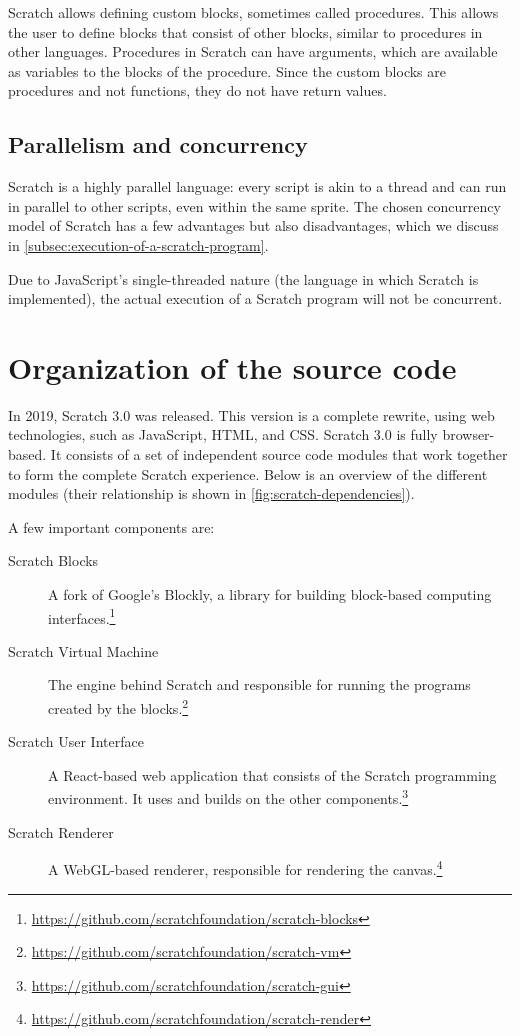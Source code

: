 \documentclass[../main]{subfiles}
\begin{document}
Scratch allows defining custom blocks, sometimes called procedures.
This allows the user to define blocks that consist of other blocks, similar to procedures in other languages.
Procedures in Scratch can have arguments, which are available as variables to the blocks of the procedure.
Since the custom blocks are procedures and not functions, they do not have return values.

\subsection{Parallelism and concurrency}\label{subsec:parallelism}

Scratch is a highly parallel language: every script is akin to a thread and can run in parallel to other scripts, even within the same sprite.
The chosen concurrency model of Scratch has a few advantages but also disadvantages, which we discuss in \cref{subsec:execution-of-a-scratch-program}.

Due to JavaScript's single-threaded nature (the language in which Scratch is implemented), the actual execution of a Scratch program will not be concurrent.

\section{Organization of the source code}\label{sec:scratch-internal}

In 2019, Scratch 3.0 was released.
This version is a complete rewrite, using web technologies, such as JavaScript, HTML, and CSS\@.
Scratch 3.0 is fully browser-based.
It consists of a set of independent source code modules that work together to form the complete Scratch experience.
Below is an overview of the different modules (their relationship is shown in \cref{fig:scratch-dependencies}).

A few important components are:

\begin{description}
    \item[Scratch Blocks] A fork of Google's Blockly, a library for building block-based computing interfaces.\footnote{\url{https://github.com/scratchfoundation/scratch-blocks}}
    \item[Scratch Virtual Machine] The engine behind Scratch and responsible for running the programs created by the blocks.\footnote{\url{https://github.com/scratchfoundation/scratch-vm}}
    \item[Scratch User Interface] A React-based web application that consists of the Scratch programming environment. It uses and builds on the other components.\footnote{\url{https://github.com/scratchfoundation/scratch-gui}}
    \item[Scratch Renderer] A WebGL-based renderer, responsible for rendering the canvas.\footnote{\url{https://github.com/scratchfoundation/scratch-render}}
\end{description}
\end{document}
